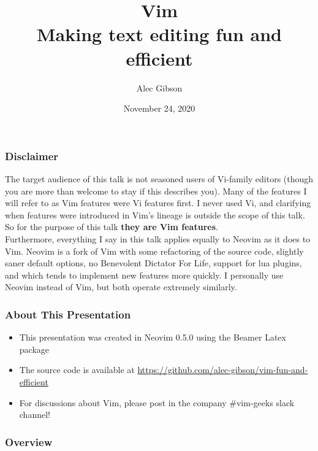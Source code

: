 \documentclass{beamer}
\title{\huge Vim \\
    \large Making text editing fun and efficient
}
\author{Alec Gibson}
\institute[BlueCat]
{
    BlueCat Networks \\
    \medskip
    \textit{agibson@bluecatnetworks.com}
}
\date{November 24, 2020}
\begin{document}
\begin{frame}
    \titlepage %
\end{frame}

\begin{frame}
    \frametitle{Disclaimer}
    \small The target audience of this talk is not seasoned users of Vi-family editors (though you are more than welcome to stay if this describes you). Many of the features I will refer to as Vim features were Vi features first. I never used Vi, and clarifying when features were introduced in Vim's lineage is outside the scope of this talk. So for the purpose of this talk \textbf{they are Vim features}.\\
    \vspace{0.5cm}
    Furthermore, everything I say in this talk applies equally to Neovim as it does to Vim. Neovim is a fork of Vim with some refactoring of the source code, slightly saner default options, no Benevolent Dictator For Life, support for lua plugins, and which tends to implement new features more quickly. I personally use Neovim instead of Vim, but both operate extremely similarly.
\end{frame}

\begin{frame}
    \frametitle{About This Presentation}
    \begin{itemize}
	\item This presentation was created in Neovim 0.5.0 using the Beamer Latex package
	\item The source code is available at \url{https://github.com/alec-gibson/vim-fun-and-efficient}
	\item For discussions about Vim, please post in the company \#vim-geeks slack channel!
    \end{itemize}
\end{frame}

\begin{frame}
    \frametitle{Overview}
    \tableofcontents
\end{frame}
\end{document}
